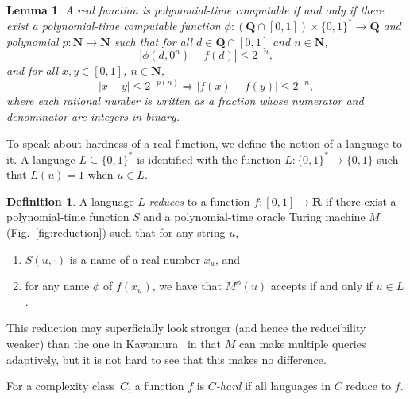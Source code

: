 \documentclass[12pt,a4paper]{article}
\newtheorem{lemma}[theorem]{Lemma}
\theoremstyle{definition}
\newtheorem{definition}[theorem]{Definition}
\theoremstyle{remark}
\newcommand{\R}{\mathbf R}
\newcommand{\N}{\mathbf N}
\newcommand{\Q}{\mathbf Q}
\begin{document}
\begin{lemma}
 \label{lem:type1representation}
 A real function is polynomial-time computable if and only if
 there exist a polynomial-time computable function 
 $\phi \colon (\Q \cap [0, 1]) \times \{0, 1\} ^* \to \Q$ and 
 polynomial $p \colon \N \to \N$ such that
 for all $d \in \Q \cap [0,1]$ and $n \in \N$,
 \begin{equation}
  |\phi(d, 0^n) - f(d)| \le 2^{-n},
 \end{equation}
 and for all $x, y \in [0, 1]$, $n \in \N$,
 \begin{equation} 
  |x-y| \le 2^{-p(n)} \Rightarrow |f(x) - f(y)| \le 2^{-n},
   \label{eq:modulus}
 \end{equation}
where each rational number is written
as a fraction whose numerator and denominator
are integers in binary.
\end{lemma}

To speak about hardness of a real function, 
we define the notion of a language to it. 
A language $L \subseteq \{0, 1\} ^*$ is identified with the function 
$L \colon \{0, 1\} ^* \to \{0, 1\}$ such that $L (u) = 1$ when $u \in L$.

\begin{definition} \label{definition: reduction}
 A language $L$ \emph{reduces} to a function $f \colon [0, 1] \to \R$
 if there exist a polynomial-time function $S$ and 
 a polynomial-time oracle Turing machine $M$ (Fig.~\ref{fig:reduction})
 such that for any string $u$, 
  \begin{enumerate}
   \item $S (u, \cdot)$ is a name of a real number $x _u$, and 
   \item for any name $\phi$ of $f (x _u)$, we have that 
    $M ^\phi (u)$ accepts if and only if $u \in L$.
  \end{enumerate}
\end{definition}
This reduction may superficially look stronger (and hence the reducibility weaker) than
the one in Kawamura~\cite{kawamura2010lipschitz} 
in that $M$ can make multiple queries adaptively, 
but it is not hard to see that this makes no difference. 

For a complexity class~$C$, a function $f$ is \emph{$C$-hard}
if all languages in $C$ reduce to $f$.
\end{document}
